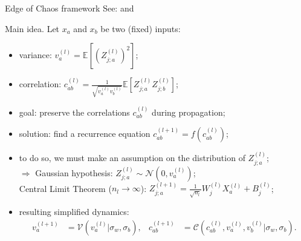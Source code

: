 \documentclass[9pt]{beamer}
\begin{document}
\begin{frame}{Edge of Chaos framework}
\alert{See:} \citet{poole2016exponential} and \citet{schoenholz2016deep}

	\medskip
	
	\alert{Main idea.} Let $x_a$ and $x_b$ be two (fixed) inputs:
	\begin{itemize}
		\item variance: $v_a^{(l)} = \mathbb{E} [(Z_{j;a}^{(l)})^2]$;
		\item correlation: $c_{ab}^{(l)} = \frac{1}{\sqrt{v_a^{(l)} v_b^{(l)}}} \mathbb{E}[Z_{j;a}^{(l)} 
		Z_{j;b}^{(l)}]$; 
		\item goal: preserve the correlations $c_{ab}^{(l)}$ during propagation; 
		\item solution: find a recurrence equation $c_{ab}^{(l + 1)} = f(c_{ab}^{(l)})$; 
		\item to do so, we must make an assumption on the distribution of $Z_{j;a}^{(l)}$; \\
			$\Rightarrow$ Gaussian hypothesis: $Z_{j;a}^{(l)} \sim \mathcal{N}(0, v_a^{(l)})$; \\
			Central Limit Theorem ($n_{l} \rightarrow \infty$): $ Z^{(l + 1)}_{j;a} = \frac{1}{\sqrt{n_{l}}}W_j^{(l)} 
			X_a^{(l)} + B^{(l)}_j$; 
		\item resulting simplified dynamics: 
			\begin{align*}
				v_{a}^{(l + 1)}&= \mathcal{V}(v_{a}^{(l)} | \sigma_w, \sigma_b), & c_{ab}^{(l + 1)} &= 
				\mathcal{C}(c_{ab}^{(l)}, v_a^{(l)}, v_b^{(l)} | \sigma_w, \sigma_b) .
			\end{align*}
	\end{itemize}
\end{frame}
\end{document}
